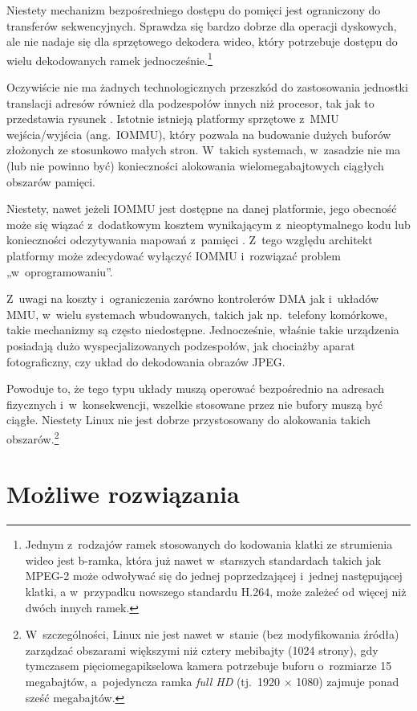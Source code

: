 Niestety mechanizm bezpośredniego dostępu do pomięci jest ograniczony
do transferów sekwencyjnych.  Sprawdza się bardzo dobrze dla operacji
dyskowych, ale nie nadaje się dla sprzętowego dekodera wideo, który
potrzebuje dostępu do wielu dekodowanych ramek
jednocześnie.\footnote{Jednym z~rodzajów ramek stosowanych do
  kodowania klatki ze strumienia wideo jest b-ramka, która już nawet
  w~starszych standardach takich jak MPEG-2 może odwoływać się do
  jednej poprzedzającej i~jednej następującej klatki, a w~przypadku
  nowszego standardu H.264, może zależeć od więcej niż dwóch innych
  ramek.}

Oczywiście nie ma żadnych technologicznych przeszkód do zastosowania
jednostki translacji adresów również dla podzespołów innych niż
procesor, tak jak to przedstawia rysunek .
Istotnie istnieją platformy sprzętowe z~MMU wejścia/wyjścia
(ang.\ IOMMU), który pozwala na budowanie dużych buforów złożonych ze
stosunkowo małych stron.  W~takich systemach, w~zasadzie nie ma (lub
nie powinno być) konieczności alokowania wielomegabajtowych ciągłych
obszarów pamięci.

Niestety, nawet jeżeli IOMMU jest dostępne na danej platformie, jego
obecność może się wiązać z~dodatkowym kosztem wynikającym
z~nieoptymalnego kodu \autocite{bib:price-of-safety} lub konieczności
odczytywania mapowań z~pamięci
\autocite{bib:mitigate-iotlb-bottleneck}.  Z~tego względu architekt
platformy może zdecydować wyłączyć IOMMU i~rozwiązać problem
„w~oprogramowaniu”.

Z~uwagi na koszty i~ograniczenia zarówno kontrolerów DMA jak i~układów
MMU, w~wielu systemach wbudowanych, takich jak np.\ telefony
komórkowe, takie mechanizmy są często niedostępne.  Jednocześnie,
właśnie takie urządzenia posiadają dużo wyspecjalizowanych
podzespołów, jak chociażby aparat fotograficzny, czy układ do
dekodowania obrazów JPEG.

Powoduje to, że tego typu układy muszą operować bezpośrednio na
adresach fizycznych i~w~konsekwencji, wszelkie stosowane przez nie
bufory muszą być ciągłe.  Niestety Linux nie jest dobrze przystosowany
do alokowania takich obszarów.\footnote{W~szczególności, Linux nie
  jest nawet w~stanie (bez modyfikowania źródła) zarządzać obszarami
  większymi niż cztery mebibajty (1024 strony), gdy tymczasem
  pięciomegapikselowa kamera potrzebuje buforu o~rozmiarze 15
  megabajtów, a~pojedyncza ramka \textit{full HD} (tj.\ 1920 $\times$
  1080) zajmuje ponad sześć megabajtów.}


\section{Możliwe rozwiązania}

